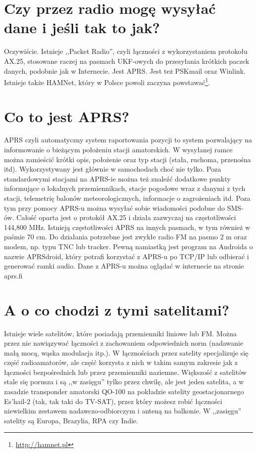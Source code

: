 \documentclass[a4paper,12pt]{article}
\begin{document}
\section{Czy przez radio mogę wysyłać dane i jeśli tak to jak?}
Oczywiście. Istnieje ,,Packet Radio'', czyli łączności z wykorzystaniem protokołu AX.25, stosowane raczej na pasmach UKF-owych do przesyłania krótkich paczek danych, podobnie jak w Internecie.
Jest APRS.
Jest też PSKmail oraz Winlink.
Istnieje także HAMNet, który w Polsce powoli zaczyna powstawać\footnote{\url{http://hamnet.pl}}.

\section{Co to jest APRS?}
APRS czyli automatyczny system raportowania pozycji to system pozwalający na informowanie o bieżącym położeniu stacji amatorskich. W wysyłanej ramce można zamieścić krótki opis, położenie oraz typ stacji (stała, ruchoma, przenośna itd). Wykorzystywany jest głównie w samochodach choć nie tylko. Poza standardowymi stacjami na APRS-ie można też znaleźć dodatkowe punkty informujące o lokalnych przemiennikach, stacje pogodowe wraz z danymi z tych stacji, telemetrię balonów meteorologicznych, informacje o zagrożeniach itd. 
Poza tym przy pomocy APRS-u można wysyłać sobie wiadomości podobne do SMS-ów.
Całość oparta jest o protokół AX.25 i działa zazwyczaj na częstotliwości 144,800 MHz. Istnieją częstotliwości APRS na innych pasmach, w tym również w paśmie 70 cm.
Do działania potrzebne jest zwykłe radio FM na pasmo 2 m oraz modem, np. typu TNC lub tracker. 
Pewną namiastką jest program na Androida o nazwie APRSdroid, który potrafi korzystać z APRS-u po TCP/IP lub odbierać i generować ramki audio.
Dane z APRS-u można oglądać w internecie na stronie aprs.fi

\section{A o co chodzi z tymi satelitami?}
Istnieje wiele satelitów, które posiadają przemienniki liniowe lub FM. Można przez nie nawiązywać łączności z zachowaniem odpowiednich norm (nadawanie małą mocą, wąska modulacja itp.). W łącznościach przez satelity specjalizuje się część radioamatorów, ale część korzysta z nich w takim samym zakresie jak z łączności bezpośrednich lub przez przemienniki naziemne. Większość z satelitów stale się porusza i są ,,w zasięgu'' tylko przez chwilę, ale jest jeden satelita, a w zasadzie transponder amatorski QO-100 na pokładzie satelity geostacjonarnego Es'hail-2 (tak, tak taki do TV-SAT), przez który możesz robić łączności niewielkim zestawem nadawczo-odbiorczym i anteną na balkonie. W ,,zasięgu'' satelity są Europa, Brazylia, RPA czy Indie.
\end{document}
